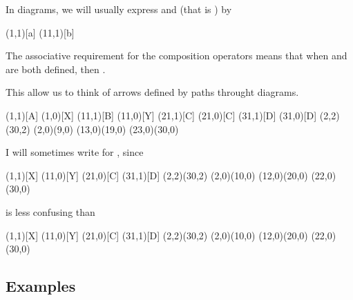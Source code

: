 \documentclass{seminar}
\begin{document}
\begin{slide}
\newslide

In diagrams, we will usually express  and 
(that
\linebreak
is ) by

\begin{cdiag}
\obj(1,1)[a]{}
\obj(11,1)[b]{}
\end{cdiag}

The associative requirement for the composition operators means
that
when  and  are both defined, then
.

This allow us to think of arrows defined by paths throught diagrams.

\begin{cdiag}
\obj(1,1)[A]{}
\obj(1,0)[X]{}
\obj(11,1)[B]{}
\obj(11,0)[Y]{}
\obj(21,1)[C]{}
\obj(21,0)[C]{}
\obj(31,1)[D]{}
\obj(31,0)[D]{}
\mor(2,2)(30,2){}
\mor(2,0)(9,0){}
\mor(13,0)(19,0){}
\mor(23,0)(30,0){}
\end{cdiag}

\newslide

I will sometimes write \tm{(;)} for \tm{(\circ)}, since

\begin{cdiag}
\obj(1,1)[X]{}
\obj(11,0)[Y]{}
\obj(21,0)[C]{}
\obj(31,1)[D]{}
\mor(2,2)(30,2){}
\mor(2,0)(10,0){}
\mor(12,0)(20,0){}
\mor(22,0)(30,0){}
\end{cdiag}

is less confusing than

\begin{cdiag}
\obj(1,1)[X]{}
\obj(11,0)[Y]{}
\obj(21,0)[C]{}
\obj(31,1)[D]{}
\mor(2,2)(30,2){}
\mor(2,0)(10,0){}
\mor(12,0)(20,0){}
\mor(22,0)(30,0){}
\end{cdiag}


\newslide

\subsection*{Examples}


\end{slide}
\end{document}
